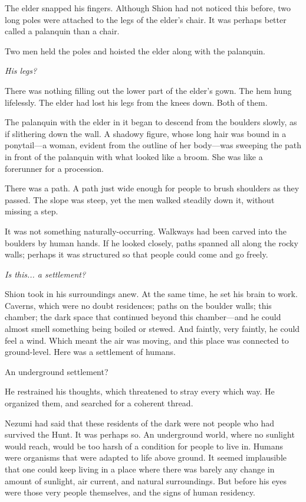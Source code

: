The elder snapped his fingers. Although Shion had not noticed this
before, two long poles were attached to the legs of the elder's chair.
It was perhaps better called a palanquin than a chair.

Two men held the poles and hoisted the elder along with the palanquin.

\emph{His legs?}

There was nothing filling out the lower part of the elder's gown. The
hem hung lifelessly. The elder had lost his legs from the knees down.
Both of them.

The palanquin with the elder in it began to descend from the boulders
slowly, as if slithering down the wall. A shadowy figure, whose long
hair was bound in a ponytail---a woman, evident from the outline of her
body---was sweeping the path in front of the palanquin with what looked
like a broom. She was like a forerunner for a procession.

There was a path. A path just wide enough for people to brush shoulders
as they passed. The slope was steep, yet the men walked steadily down
it, without missing a step.

It was not something naturally-occurring. Walkways had been carved into
the boulders by human hands. If he looked closely, paths spanned all
along the rocky walls; perhaps it was structured so that people could
come and go freely.

\emph{Is this... a settlement?}

Shion took in his surroundings anew. At the same time, he set his brain
to work. Caverns, which were no doubt residences; paths on the boulder
walls; this chamber; the dark space that continued beyond this
chamber---and he could almost smell something being boiled or stewed. And
faintly, very faintly, he could feel a wind. Which meant the air was
moving, and this place was connected to ground-level. Here was a
settlement of humans.

An underground settlement?

He restrained his thoughts, which threatened to stray every which way.
He organized them, and searched for a coherent thread.

Nezumi had said that these residents of the dark were not people who had
survived the Hunt. It was perhaps so. An underground world, where no
sunlight would reach, would be too harsh of a condition for people to
live in. Humans were organisms that were adapted to life above ground.
It seemed implausible that one could keep living in a place where there
was barely any change in amount of sunlight, air current, and natural
surroundings. But before his eyes were those very people themselves, and
the signs of human residency.

